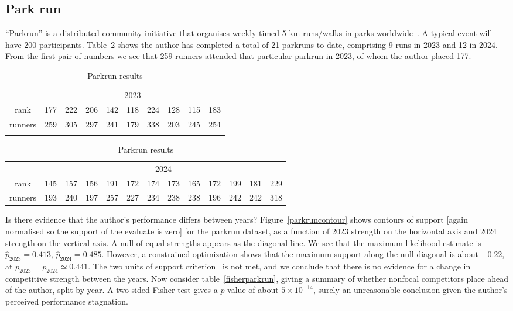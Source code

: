 \documentclass[article]{ajs}
\begin{document}
\subsection{Park run}

``Parkrun'' is a distributed community initiative that organises
weekly timed 5 km runs/walks in parks worldwide~\citep{hindley2020}.
A typical event will have 200 participants.  Table~\ref{parkruntable}
shows the author has completed a total of 21 parkruns to date,
comprising 9 runs in 2023 and 12 in 2024.  From the first pair of
numbers we see that 259 runners attended that particular parkrun in
2023, of whom the author placed 177.

\begin{table}[t]
  \centering
  \caption{Parkrun results}
\label{parkruntable}
\begin{tabular}{cccccccccc}\\
 & \multicolumn{9}{c}{2023}\\
rank   & 177& 222& 206& 142& 118& 224& 128& 115& 183\\
runners& 259& 305& 297& 241& 179& 338& 203& 245& 254\\ \\
\end{tabular}
\begin{tabular}{ccccccccccccc}
  & \multicolumn{12}{c}{2024}\\
rank      &  145& 157& 156& 191& 172& 174& 173& 165& 172& 199& 181& 229\\
runners   &  193& 240& 197& 257& 227& 234& 238& 238& 196& 242& 242& 318\\
\end{tabular}
\end{table}

Is there evidence that the author's performance differs between years?
Figure~\ref{parkruncontour} shows contours of support [again
  normalised so the support of the evaluate is zero] for the parkrun
dataset, as a function of 2023 strength on the horizontal axis and
2024 strength on the vertical axis.  A null of equal strengths appears
as the diagonal line.  We see that the maximum likelihood estimate is
$\hat{p}_\mathrm{2023}=0.413$, $\hat{p}_\mathrm{2024}=0.485$.
However, a constrained optimization shows that the maximum support
along the null diagonal is about $-0.22$, at
${p}_\mathrm{2023}={p}_\mathrm{2024}\simeq 0.441$.  The two units of
support criterion~\citep{edwards1992} is not met, and we conclude that
there is no evidence for a change in competitive strength between the
years.  Now consider table~\ref{fisherparkrun}, giving a summary of
whether nonfocal competitors place ahead of the author, split by year.
A two-sided Fisher test gives a $p$-value of about $5\times 10^{-14}$,
surely an unreasonable conclusion given the author's perceived
performance stagnation.
\end{document}
